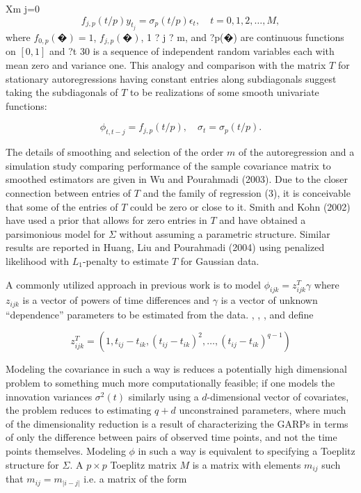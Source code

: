 \documentclass[12pt]{article}
\theoremstyle{definition}
\begin{document}
{{{{{Xm
j=0
\begin{equation}
f_{j,p}\left(t/p\right)y_{t_j} = \sigma_p\left(t/p\right)\epsilon_t, \quad t = 0, 1, 2, \dots, M,
\end{equation}
\noindent
where $f_{0,p}\left(�\right) = 1$, $f_{j,p}\left(�\right)$, 1 ? j ? m, and ?p(�) are continuous functions on $\left[0, 1\right]$ and {?t}
30 is a sequence of independent random variables each with mean zero and variance one. This analogy and comparison with the matrix $T$ for stationary autoregressions having constant
entries along subdiagonals suggest taking the subdiagonals of $T$ to be realizations of some smooth univariate functions:

\begin{equation*}
\phi_{t,t-j} = f_{j,p}\left(t/p\right),\quad \sigma_t = \sigma_p\left(t/p\right). 
\end{equation*}

The details of smoothing and selection of the order $m$ of the autoregression and a simulation study comparing performance of the sample covariance matrix to smoothed estimators are given in Wu and Pourahmadi (2003). Due to the closer connection between entries of $T$ and the family of regression (3), it is conceivable that some of the entries of $T$ could be zero or close to it. Smith and Kohn (2002) have used a prior that allows for zero entries in $T$ and have obtained a parsimonious model for $\Sigma$ without assuming a parametric structure. Similar results are reported in Huang, Liu and Pourahmadi (2004) using penalized likelihood with $L_1$-penalty to estimate $T$ for Gaussian data.}
 A commonly utilized approach in previous work is to model $\phi_{ijk} = z_{ijk}^T \gamma$ where $z_{ijk}$ is a vector of powers of time differences and $\gamma$ is a vector of unknown ``dependence'' parameters to be estimated from the data. \citet{chen2011efficient}, \citet{lin2009robust}, \citet{pan2003modelling},  and \citet{pourahmadi1999joint} define

\begin{equation}
z_{ijk}^T = \left(1, t_{ij} - t_{ik},\left( t_{ij} - t_{ik} \right)^2, \dots, \left(t_{ij} - t_{ik}\right)^{q-1} \right) \label{covmodel}
\end{equation}

Modeling the covariance in such a way is reduces a potentially high dimensional problem to something much more computationally feasible; if one models the innovation variances $\sigma^2\left(t\right)$ similarly using a $d$-dimensional vector of covariates, the problem reduces to estimating $q+d$ unconstrained parameters, where much of the dimensionality reduction is a result of characterizing the GARPs in terms of only the difference between pairs of observed time points, and not the time points themselves.  Modeling $\phi$ in such a way is equivalent to specifying a Toeplitz structure for $\Sigma$. A $p \times p$ Toeplitz matrix $M$ is a matrix with elements $m_{ij}$ such that $m_{ij} = m_{\vert i-j \vert}$ i.e. a matrix of the form

}}}}
\end{document}
